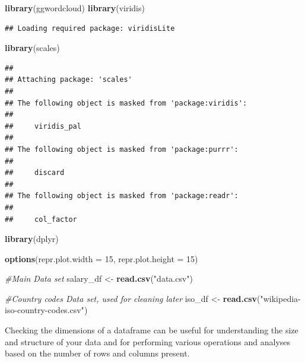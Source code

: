 \documentclass[
]{article}
\newenvironment{Shaded}{\begin{snugshade}}{\end{snugshade}}
\newcommand{\AttributeTok}[1]{\textcolor[rgb]{0.13,0.29,0.53}{#1}}
\newcommand{\CommentTok}[1]{\textcolor[rgb]{0.56,0.35,0.01}{\textit{#1}}}
\newcommand{\DecValTok}[1]{\textcolor[rgb]{0.00,0.00,0.81}{#1}}
\newcommand{\FunctionTok}[1]{\textcolor[rgb]{0.13,0.29,0.53}{\textbf{#1}}}
\newcommand{\NormalTok}[1]{#1}
\newcommand{\OtherTok}[1]{\textcolor[rgb]{0.56,0.35,0.01}{#1}}
\newcommand{\StringTok}[1]{\textcolor[rgb]{0.31,0.60,0.02}{#1}}
\begin{document}
\begin{Shaded}
\begin{Highlighting}[]
    \FunctionTok{library}\NormalTok{(ggwordcloud)}
    \FunctionTok{library}\NormalTok{(viridis)}
\end{Highlighting}
\end{Shaded}

\begin{verbatim}
## Loading required package: viridisLite
\end{verbatim}

\begin{Shaded}
\begin{Highlighting}[]
    \FunctionTok{library}\NormalTok{(scales)}
\end{Highlighting}
\end{Shaded}

\begin{verbatim}
## 
## Attaching package: 'scales'
## 
## The following object is masked from 'package:viridis':
## 
##     viridis_pal
## 
## The following object is masked from 'package:purrr':
## 
##     discard
## 
## The following object is masked from 'package:readr':
## 
##     col_factor
\end{verbatim}

\begin{Shaded}
\begin{Highlighting}[]
    \FunctionTok{library}\NormalTok{(dplyr)}

    \FunctionTok{options}\NormalTok{(}\AttributeTok{repr.plot.width =} \DecValTok{15}\NormalTok{, }\AttributeTok{repr.plot.height =} \DecValTok{15}\NormalTok{)}
\end{Highlighting}
\end{Shaded}

\begin{Shaded}
\begin{Highlighting}[]
\CommentTok{\#Main Data set}
\NormalTok{salary\_df }\OtherTok{\textless{}{-}} \FunctionTok{read.csv}\NormalTok{(}\StringTok{"data.csv"}\NormalTok{)}

\CommentTok{\#Country codes Data set, used for cleaning later}
\NormalTok{iso\_df }\OtherTok{\textless{}{-}} \FunctionTok{read.csv}\NormalTok{(}\StringTok{"wikipedia{-}iso{-}country{-}codes.csv"}\NormalTok{)}
\end{Highlighting}
\end{Shaded}

Checking the dimensions of a dataframe can be useful for understanding
the size and structure of your data and for performing various
operations and analyses based on the number of rows and columns present.
\end{document}
